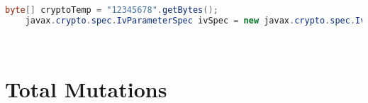 \begin{lstlisting}[frame=tb,caption={\small Static Keystore}, label={lst:statickeystore},language=java]
    byte[] cryptoTemp = "12345678".getBytes();
    javax.crypto.spec.IvParameterSpec ivSpec = new javax.crypto.spec.IvParameterSpec.getInstance(cryptoTemp,"AES");
                        
                            
\end{lstlisting}
\vspace{-0.25em}
        

\section{Total Mutations}
\label{appendixA:totalMutations}


